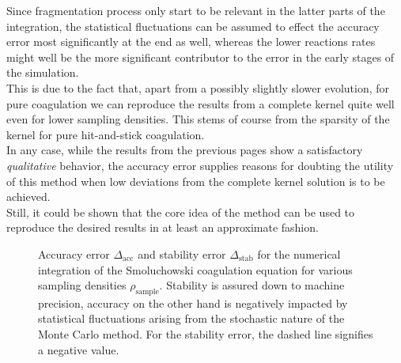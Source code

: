     Since fragmentation process only start to be relevant in the latter parts of the 
    integration, the statistical fluctuations can be assumed to 
    effect the accuracy error most significantly at the end as well, whereas the 
    lower reactions rates might well be the more significant contributor to 
    the error in the early stages of the simulation. \\

    This is due to the fact that, apart from a possibly slightly slower evolution, 
    for pure coagulation we can reproduce the results from a complete kernel quite 
    well even for lower sampling densities. This stems of course from the 
    sparsity of the kernel for pure hit-and-stick coagulation. \\

    In any case, while the results from the previous pages show a satisfactory 
    \textit{qualitative} behavior, the accuracy error supplies reasons for 
    doubting the utility of this method when low deviations from the complete 
    kernel solution is to be achieved. \\

    Still, it could be shown that the core idea of the method can be used to 
    reproduce the desired results in at least an approximate fashion. 
    
    \begin{figure}[h!]
        \caption{
            Accuracy error $\Delta_\text{acc}$ and stability error $\Delta_\text{stab}$ for the 
            numerical integration of the Smoluchowski coagulation equation for various sampling 
            densities $\rho_\text{sample}$. 
            Stability is assured down to machine precision, accuracy on the other hand is 
            negatively impacted by statistical fluctuations arising from the stochastic 
            nature of the Monte Carlo method.
            For the stability error, the dashed line signifies a negative value. \\
        }
        \label{fig:stab_and_acc_error}
    \end{figure}
    
